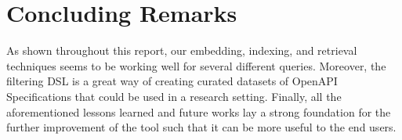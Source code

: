 \section{Concluding Remarks}\label{sec:concluding-remarks}
As shown throughout this report, our embedding, indexing, and retrieval techniques seems to be working well for several different queries.
Moreover, the filtering DSL is a great way of creating curated datasets of OpenAPI Specifications that could be used in a research setting.
Finally, all the aforementioned lessons learned and future works lay a strong foundation for the further improvement of the tool such that it can be more useful to the end users.
